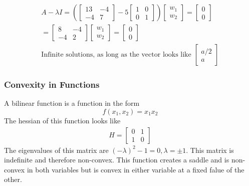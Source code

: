 \begin{align}
  A - \lambda I = 
(  \begin{bmatrix}
     13 & -4 \\
     -4 & 7
  \end{bmatrix}
  - 5
  \begin{bmatrix}
    1 & 0 \\
    0 & 1
  \end{bmatrix})
  \begin{bmatrix}
    w_1 \\
    w_2
  \end{bmatrix}
  =
  \begin{bmatrix}
    0 \\ 
    0
  \end{bmatrix}
  \\ 
  =
  \begin{bmatrix}
    8 & -4 \\
    -4 & 2
  \end{bmatrix}
  \begin{bmatrix}
    w_1 \\
    w_2
  \end{bmatrix}
  =
  \begin{bmatrix}
    0 \\ 
    0
  \end{bmatrix} \\
  \text{Infinite solutions, as long as the vector looks like }
  \begin{bmatrix}
    a/2 \\
    a
  \end{bmatrix}
\end{align}
\subsubsection{Convexity in Functions}
A bilinear function is a function in the form 
\begin{equation}
  f(x_1, x_2) = x_1 x_2
\end{equation}
The hessian of this function looks like
\begin{align}
  H = 
  \begin{bmatrix}
     0 & 1 \\
     1 & 0
  \end{bmatrix}
\end{align}
The eigenvalues of this matrix are $(-\lambda)^2 - 1 = 0, \lambda = \pm 1$.
This matrix is indefinite and therefore non-convex.
This function creates a saddle and is non-convex in both variables but is convex in either variable at a fixed falue of the other.